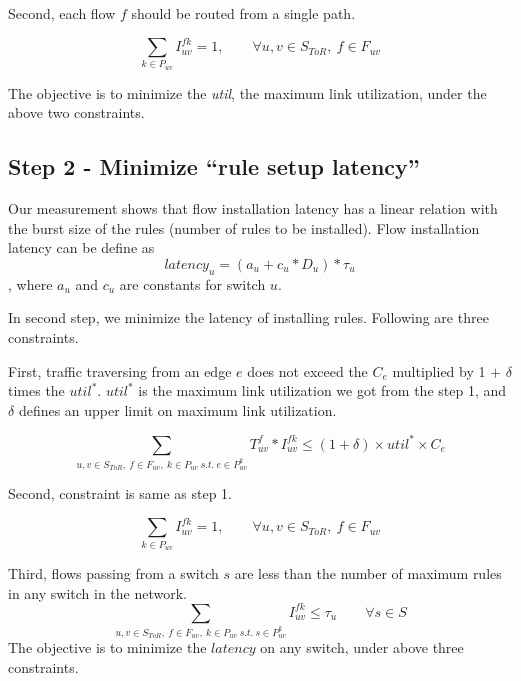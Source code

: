 	
	
	Second, each flow $f$ should be routed from a single path.

\begin{equation}
    \sum _{k  \in P_{uv}} I^{fk}_{uv} = 1 ,\quad \quad \forall u,v \in S_{ToR},~ f \in F_{uv}
\end{equation}
  

The objective is to minimize the \textit{util}, the maximum link utilization, under the above two constraints. 

\subsection{Step 2 - Minimize ``rule setup latency''}
Our measurement shows that flow installation latency has a linear relation with the burst size of the rules (number of rules to be installed). Flow installation latency can be define as
  \begin{equation*}
            latency_{u} = (a_{u}  + c_{u}* D_{u}) *\tau_{u}
  \end{equation*}
, where $a_{u}$ and $c_{u}$ are constants for switch $u$.

In second step, we minimize the latency of installing rules. Following are three constraints.
 
First,  traffic traversing from an edge $e$ does not exceed the $C_e$ multiplied by 1 $+$ $\delta$ times the $util^*$. $util^*$ is the maximum link utilization we got from the step 1, and  $\delta$ defines an upper limit on maximum link utilization.

\begin{equation}
    \sum _{u,v \in S_{ToR},~f \in F_{uv},~k  \in P_{uv}~s.t.~e \in P^k _{uv}} T ^f _{uv} *  I^{fk}_{uv} \leq (1 + \delta) \times util^* \times C_e 
\end{equation}

  Second, constraint is same as step 1.
  
\begin{equation}
      \sum _{k  \in P_{uv}} I^{fk}_{uv} = 1 ,\quad \quad \forall u,v \in S_{ToR},~ f \in F_{uv}
\end{equation}

  Third, flows passing from a switch $s$ are less than the number of maximum rules in any switch in the network.
\begin{equation}
                       \sum_{u,v \in S_{ToR}, ~f \in F_{uv}, ~k \in P_{uv} ~s.t.~ s\in P^k_{uv} } I^{fk}_{uv} \leq \tau_{u} \quad \quad \forall s \in S
\end{equation}
The objective is to minimize the $latency$ on any switch, under above three constraints.   
  

